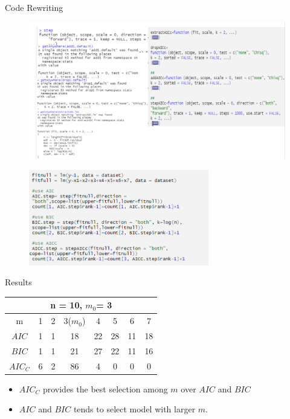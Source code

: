 \documentclass[11pt]{beamer}
\begin{document}
\begin{frame}{Code Rewriting}
\begin{figure}[htb]
        \includegraphics[width=1.1\textwidth]{Picture2}
        \medskip
    \end{figure}
 
\end{frame}

\begin{frame}
\begin{figure}[htb]
        \centering
        \includegraphics[width=0.7\textwidth]{Picture3}
        \medskip
    \end{figure}
\end{frame}

\begin{frame}{Results}
\begin{center}
\begin{tabular}{ c | c c c c c c c}
\hline
 \multicolumn{8}{c}{n = 10, $m_0$= 3} \\
 \hline
    m  & 1 & 2 & 3($m_0$) & 4 & 5 & 6 & 7\\
    \hline
 $AIC$ & 1 & 1 & 18 & 22 & 28 & 11 &18\\ 
 $BIC$ & 1 & 1 & 21 & 27 & 22 & 11 & 16 \\  
 $AIC_C$ & 6 & 2 & 86 & 4 & 0 & 0 & 0 
\end{tabular}
\end{center}
 \begin{itemize}
     \item $AIC_C$ provides the best selection among $m$ over $AIC$ and $BIC$
     \item $AIC$ and $BIC$ tends to select model with larger $m$.
 \end{itemize}

 \end{frame}
\end{document}
